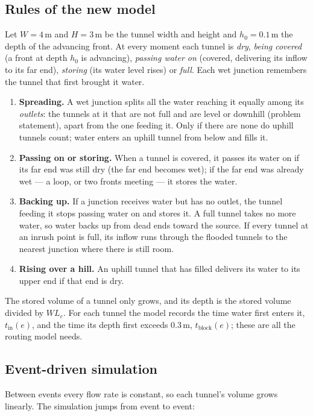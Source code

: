 \documentclass[11pt,a4paper]{article}
\theoremstyle{remark}
\newcommand{\tin}{t_{\mathrm{in}}}
\newcommand{\tblock}{t_{\mathrm{block}}}
\begin{document}
\subsection{Rules of the new model}
Let $W=4$\,m and $H=3$\,m be the tunnel width and height and $h_0=0.1$\,m the depth of the advancing front. At every moment each tunnel is \emph{dry}, \emph{being covered} (a front at depth $h_0$ is advancing), \emph{passing water on} (covered, delivering its inflow to its far end), \emph{storing} (its water level rises) or \emph{full}. Each wet junction remembers the tunnel that first brought it water.
\begin{enumerate}[leftmargin=2em, itemsep=2pt, topsep=2pt, label=\textbf{R\arabic*.}]
  \item \textbf{Spreading.} A wet junction splits all the water reaching it equally among its \emph{outlets}: the tunnels at it that are not full and are level or downhill (problem statement), apart from the one feeding it. Only if there are none do uphill tunnels count; water enters an uphill tunnel from below and fills it.
  \item \textbf{Passing on or storing.} When a tunnel is covered, it passes its water on if its far end was still dry (the far end becomes wet); if the far end was already wet --- a loop, or two fronts meeting --- it stores the water.
  \item \textbf{Backing up.} If a junction receives water but has no outlet, the tunnel feeding it stops passing water on and stores it. A full tunnel takes no more water, so water backs up from dead ends toward the source. If every tunnel at an inrush point is full, its inflow runs through the flooded tunnels to the nearest junction where there is still room.
  \item \textbf{Rising over a hill.} An uphill tunnel that has filled delivers its water to its upper end if that end is dry.
\end{enumerate}
The stored volume of a tunnel only grows, and its depth is the stored volume divided by $W L_e$. For each tunnel the model records the time water first enters it, $\tin(e)$, and the time its depth first exceeds 0.3\,m, $\tblock(e)$; these are all the routing model needs.

\subsection{Event-driven simulation}
Between events every flow rate is constant, so each tunnel's volume grows linearly. The simulation jumps from event to event:
\end{document}
